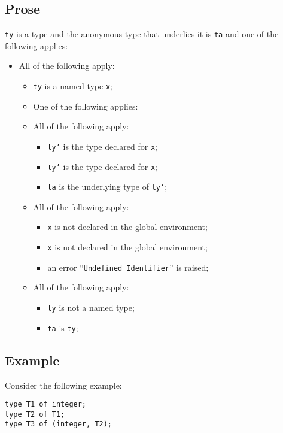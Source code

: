 \documentclass{book}
\begin{document}
\subsection{Prose}
\texttt{ty} is a type and the anonymous type that underlies it is \texttt{ta} and one of the following
applies:
\begin{itemize}
    \item All of the following apply:
      \begin{itemize}
        \item \texttt{ty} is a named type \texttt{x};
        \item One of the following applies:
        \item All of the following apply:
        \begin{itemize}
        \item \texttt{ty'} is the type declared for \texttt{x};
        \item \texttt{ty'} is the type declared for \texttt{x};
        \item \texttt{ta} is the underlying type of \texttt{ty'};
        \end{itemize}
        \item All of the following apply:
        \begin{itemize}
        \item \texttt{x} is not declared in the global environment;
        \item \texttt{x} is not declared in the global environment;
        \item an error ``\texttt{Undefined Identifier}'' is raised;
        \end{itemize}
        \item All of the following apply:
        \begin{itemize}
        \item \texttt{ty} is not a named type;
        \item \texttt{ta} is \texttt{ty};
      \end{itemize}
    \end{itemize}
\end{itemize}


\subsection{Example}
Consider the following example:
\begin{verbatim}
type T1 of integer;
type T2 of T1;
type T3 of (integer, T2);
\end{verbatim}
\end{document}
